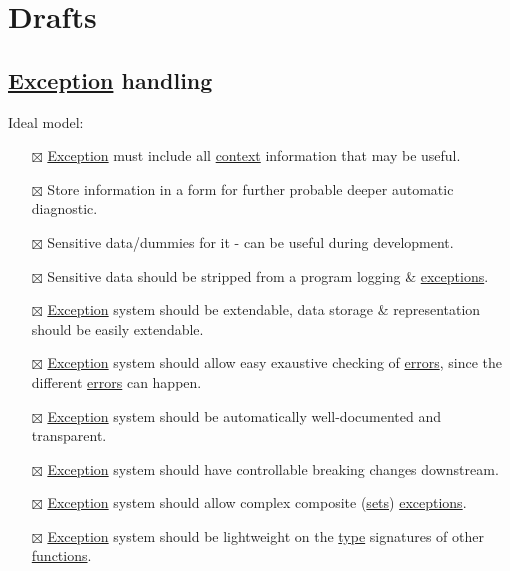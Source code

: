 \documentclass[a4paper,14pt,oneside]{book}
\begin{document}
\part{Drafts}
\label{sec:org3a87239}

\chapter{\hyperref[org4a5dbbf]{Exception} handling}
\label{sec:org9cb0f9f}

Ideal model:\\

\begin{itemize}
\item[{$\boxtimes$}] \hyperref[org4a5dbbf]{Exception} must include all \hyperref[orgacc09e2]{context} information that may be useful.\\
\item[{$\boxtimes$}] Store information in a form for further probable deeper automatic diagnostic.\\
\item[{$\boxtimes$}] Sensitive data/dummies for it - can be useful during development.\\
\item[{$\boxtimes$}] Sensitive data should be stripped from a program logging \& \hyperref[org21526fc]{exceptions}.\\
\item[{$\boxtimes$}] \hyperref[org4a5dbbf]{Exception} system should be extendable, data storage \& representation should be easily extendable.\\
\item[{$\boxtimes$}] \hyperref[org4a5dbbf]{Exception} system should allow easy exaustive checking of \hyperref[orge2e4688]{errors}, since the different \hyperref[orge2e4688]{errors} can happen.\\
\item[{$\boxtimes$}] \hyperref[org4a5dbbf]{Exception} system should be automatically well-documented and transparent.\\
\item[{$\boxtimes$}] \hyperref[org4a5dbbf]{Exception} system should have controllable breaking changes downstream.\\
\item[{$\boxtimes$}] \hyperref[org4a5dbbf]{Exception} system should allow complex composite (\hyperref[orgaae622f]{sets}) \hyperref[org21526fc]{exceptions}.\\
\item[{$\boxtimes$}] \hyperref[org4a5dbbf]{Exception} system should be lightweight on the \hyperref[orga286a54]{type} signatures of other \hyperref[org97ed87c]{functions}.\\

\end{itemize}
\end{document}
